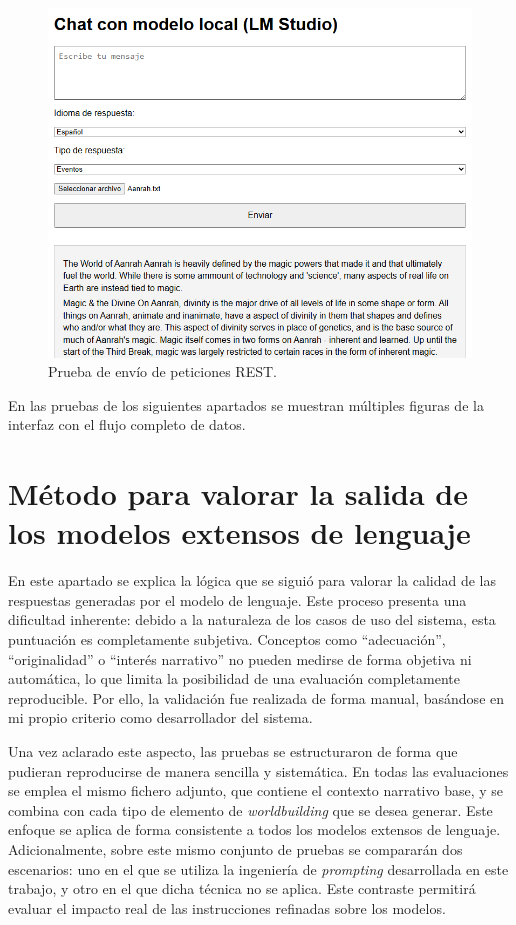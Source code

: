 \begin{figure}[htbp]
	\centering
	\includegraphics[width=1\textwidth]{./Figures/web-test.png}
	\caption{Prueba de envío de peticiones REST.}
	\label{fig:web-test}
\end{figure}

En las pruebas de los siguientes apartados se muestran múltiples figuras de la interfaz con el flujo completo de datos.

\section{Método para valorar la salida de los modelos extensos de lenguaje}
En este apartado se explica la lógica que se siguió para valorar la calidad de las respuestas
generadas por el modelo de lenguaje.
Este proceso presenta una dificultad inherente:
debido a la naturaleza de los casos de uso del sistema, esta puntuación es completamente subjetiva.
Conceptos como “adecuación”, “originalidad” o “interés narrativo” no pueden medirse de forma objetiva ni automática,
lo que limita la posibilidad de una evaluación completamente reproducible.
Por ello, la validación fue realizada de forma manual, basándose en mi propio criterio como desarrollador del sistema.

Una vez aclarado este aspecto, las pruebas se estructuraron de forma que pudieran reproducirse de manera sencilla y sistemática.
En todas las evaluaciones se emplea el mismo fichero adjunto, que contiene el contexto narrativo base,
y se combina con cada tipo de elemento de \textit{worldbuilding} que se desea generar.
Este enfoque se aplica de forma consistente a todos los modelos extensos de lenguaje.
Adicionalmente, sobre este mismo conjunto de pruebas se compararán dos escenarios:
uno en el que se utiliza la ingeniería de \textit{prompting} desarrollada en este trabajo,
y otro en el que dicha técnica no se aplica.
Este contraste permitirá evaluar el impacto real de las instrucciones
refinadas sobre los modelos.

